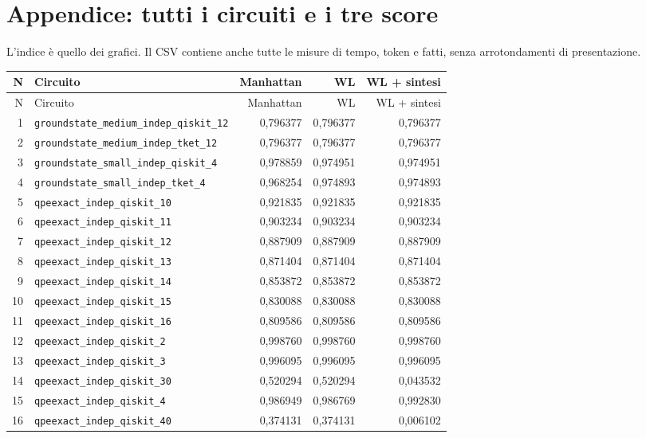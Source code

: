 \documentclass[a4paper,10pt]{article}
\begin{document}
\clearpage\section{Appendice: tutti i circuiti e i tre score}
L'indice è quello dei grafici. Il CSV contiene anche tutte le misure di tempo, token e fatti, senza arrotondamenti di presentazione.\par\begingroup\small\renewcommand{\arraystretch}{1.1}\setlength{\tabcolsep}{4pt}\begin{longtable}{r p{8.2cm} r r r}\toprule N & Circuito & Manhattan & WL & WL + sintesi\\\midrule\endfirsthead\toprule N & Circuito & Manhattan & WL & WL + sintesi\\\midrule\endhead1 & \nolinkurl{groundstate_medium_indep_qiskit_12} & 0,796377 & 0,796377 & 0,796377\\ 
2 & \nolinkurl{groundstate_medium_indep_tket_12} & 0,796377 & 0,796377 & 0,796377\\ 
3 & \nolinkurl{groundstate_small_indep_qiskit_4} & 0,978859 & 0,974951 & 0,974951\\ 
4 & \nolinkurl{groundstate_small_indep_tket_4} & 0,968254 & 0,974893 & 0,974893\\ 
5 & \nolinkurl{qpeexact_indep_qiskit_10} & 0,921835 & 0,921835 & 0,921835\\ 
6 & \nolinkurl{qpeexact_indep_qiskit_11} & 0,903234 & 0,903234 & 0,903234\\ 
7 & \nolinkurl{qpeexact_indep_qiskit_12} & 0,887909 & 0,887909 & 0,887909\\ 
8 & \nolinkurl{qpeexact_indep_qiskit_13} & 0,871404 & 0,871404 & 0,871404\\ 
9 & \nolinkurl{qpeexact_indep_qiskit_14} & 0,853872 & 0,853872 & 0,853872\\ 
10 & \nolinkurl{qpeexact_indep_qiskit_15} & 0,830088 & 0,830088 & 0,830088\\ 
11 & \nolinkurl{qpeexact_indep_qiskit_16} & 0,809586 & 0,809586 & 0,809586\\ 
12 & \nolinkurl{qpeexact_indep_qiskit_2} & 0,998760 & 0,998760 & 0,998760\\ 
13 & \nolinkurl{qpeexact_indep_qiskit_3} & 0,996095 & 0,996095 & 0,996095\\ 
14 & \nolinkurl{qpeexact_indep_qiskit_30} & 0,520294 & 0,520294 & 0,043532\\ 
15 & \nolinkurl{qpeexact_indep_qiskit_4} & 0,986949 & 0,986769 & 0,992830\\ 
16 & \nolinkurl{qpeexact_indep_qiskit_40} & 0,374131 & 0,374131 & 0,006102\\ 

\end{longtable}
\end{document}
